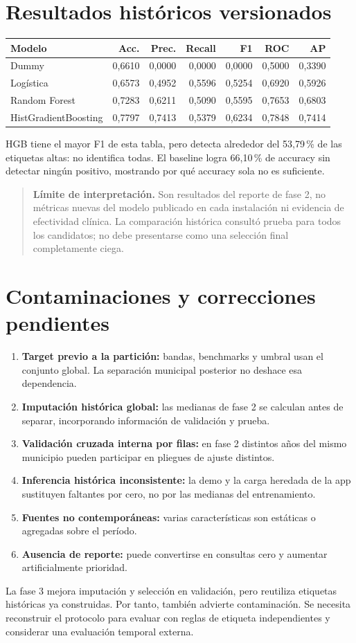 \documentclass[11pt,a4paper]{report}
\newcommand{\advertencia}[1]{\begin{quote}\textbf{Límite de interpretación.} #1\end{quote}}
\begin{document}
\section{Resultados históricos versionados}
\begin{center}
\small
\begin{tabular}{@{}lrrrrrr@{}}
\toprule
\textbf{Modelo} & \textbf{Acc.} & \textbf{Prec.} & \textbf{Recall} & \textbf{F1} & \textbf{ROC} & \textbf{AP}\\
\midrule
Dummy & 0,6610 & 0,0000 & 0,0000 & 0,0000 & 0,5000 & 0,3390\\
Logística & 0,6573 & 0,4952 & 0,5596 & 0,5254 & 0,6920 & 0,5926\\
Random Forest & 0,7283 & 0,6211 & 0,5090 & 0,5595 & 0,7653 & 0,6803\\
HistGradientBoosting & 0,7797 & 0,7413 & 0,5379 & 0,6234 & 0,7848 & 0,7414\\
\bottomrule
\end{tabular}
\end{center}
HGB tiene el mayor F1 de esta tabla, pero detecta alrededor del 53,79\,\% de las etiquetas altas: no identifica todas. El baseline logra 66,10\,\% de accuracy sin detectar ningún positivo, mostrando por qué accuracy sola no es suficiente.

\advertencia{Son resultados del reporte de fase 2, no métricas nuevas del modelo publicado en cada instalación ni evidencia de efectividad clínica. La comparación histórica consultó prueba para todos los candidatos; no debe presentarse como una selección final completamente ciega.}

\section{Contaminaciones y correcciones pendientes}
\begin{enumerate}
\item \textbf{Target previo a la partición:} bandas, benchmarks y umbral usan el conjunto global. La separación municipal posterior no deshace esa dependencia.
\item \textbf{Imputación histórica global:} las medianas de fase 2 se calculan antes de separar, incorporando información de validación y prueba.
\item \textbf{Validación cruzada interna por filas:} en fase 2 distintos años del mismo municipio pueden participar en pliegues de ajuste distintos.
\item \textbf{Inferencia histórica inconsistente:} la demo y la carga heredada de la app sustituyen faltantes por cero, no por las medianas del entrenamiento.
\item \textbf{Fuentes no contemporáneas:} varias características son estáticas o agregadas sobre el período.
\item \textbf{Ausencia de reporte:} puede convertirse en consultas cero y aumentar artificialmente prioridad.
\end{enumerate}
La fase 3 mejora imputación y selección en validación, pero reutiliza etiquetas históricas ya construidas. Por tanto, también advierte contaminación. Se necesita reconstruir el protocolo para evaluar con reglas de etiqueta independientes y considerar una evaluación temporal externa.
\end{document}
